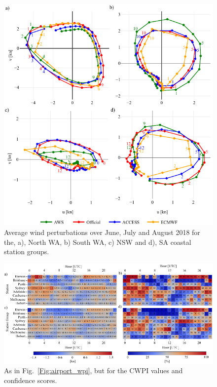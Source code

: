 \documentclass[twocol]{ametsoc}
\begin{document}
\begin{figure}
\centering
\includegraphics[width=33pc]{clim_hodo.pdf}
\caption{Average wind perturbations over June, July and August 2018 for the, a), North WA, b) South WA, c) NSW and d), SA coastal station groups.}
\label{Fig:clim_hodo}
\end{figure}

\begin{figure}
\centering
\includegraphics[width=39pc]{airport_cwpi.pdf}
\caption{As in Fig.~\ref{Fig:airport_wpi}, but for the CWPI values and confidence scores.}
\label{Fig:airport_cwpi}
\end{figure}
\end{document}
